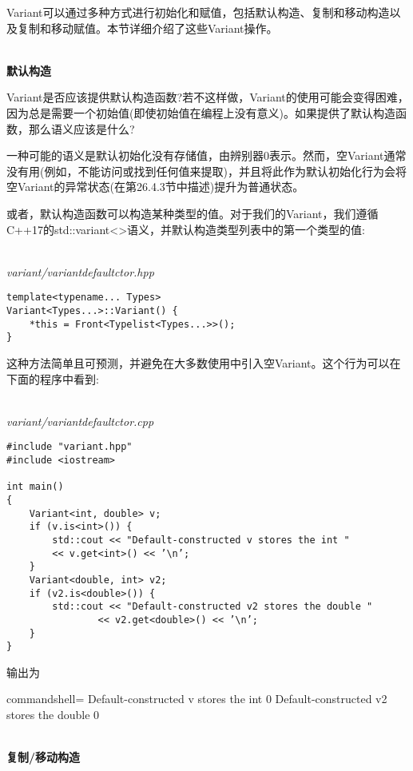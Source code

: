Variant可以通过多种方式进行初始化和赋值，包括默认构造、复制和移动构造以及复制和移动赋值。本节详细介绍了这些Variant操作。

\hspace*{\fill} \\ %
\noindent
\textbf{默认构造}

Variant是否应该提供默认构造函数?若不这样做，Variant的使用可能会变得困难，因为总是需要一个初始值(即使初始值在编程上没有意义)。如果提供了默认构造函数，那么语义应该是什么?

一种可能的语义是默认初始化没有存储值，由辨别器0表示。然而，空Variant通常没有用(例如，不能访问或找到任何值来提取)，并且将此作为默认初始化行为会将空Variant的异常状态(在第26.4.3节中描述)提升为普通状态。

或者，默认构造函数可以构造某种类型的值。对于我们的Variant，我们遵循C++17的std::variant<>语义，并默认构造类型列表中的第一个类型的值:

\hspace*{\fill} \\ %
\noindent
\textit{variant/variantdefaultctor.hpp}
\begin{lstlisting}[style=styleCXX]
template<typename... Types>
Variant<Types...>::Variant() {
	*this = Front<Typelist<Types...>>();
}
\end{lstlisting}

这种方法简单且可预测，并避免在大多数使用中引入空Variant。这个行为可以在下面的程序中看到:

\hspace*{\fill} \\ %
\noindent
\textit{variant/variantdefaultctor.cpp}
\begin{lstlisting}[style=styleCXX]
#include "variant.hpp"
#include <iostream>

int main()
{
	Variant<int, double> v;
	if (v.is<int>()) {
		std::cout << "Default-constructed v stores the int "
		<< v.get<int>() << ’\n’;
	}
	Variant<double, int> v2;
	if (v2.is<double>()) {
		std::cout << "Default-constructed v2 stores the double "
				<< v2.get<double>() << ’\n’;
	}
}
\end{lstlisting}

输出为

\begin{tcblisting}{commandshell={}}
Default-constructed v stores the int 0
Default-constructed v2 stores the double 0
\end{tcblisting}

\hspace*{\fill} \\ %
\noindent
\textbf{复制/移动构造}

